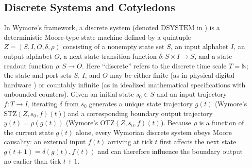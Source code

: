 \subsection{Discrete Systems and Cotyledons}
In Wymore's framework, a discrete system (denoted $\mathrm{DSYSTEM}$ in \citet{Wymore1993}) is a deterministic Moore-type state machine defined by a quintuple $Z=(S,I,O,\delta,\rho)$ consisting of a nonempty state set $S$, an input alphabet $I$, an output alphabet $O$, a next-state transition function $\delta:S\times I\to S$, and a state readout function $\rho:S\to O$. Here ``discrete'' refers to the discrete time scale $T=\mathbb{N}$; the state and port sets $S$, $I$, and $O$ may be either finite (as in physical digital hardware \citep{Wymore1993,BaierKatoen2008}) or countably infinite (as in idealized mathematical specifications with unbounded counters). Given an initial state $s_0\in S$ and an input trajectory $f:T\to I$, iterating $\delta$ from $s_0$ generates a unique state trajectory $g(t)$ (Wymore's $\mathrm{STZ}(Z,s_0,f)(t)$) and a corresponding boundary output trajectory $y(t)=\rho(g(t))$ (Wymore's $\mathrm{OTZ}(Z,s_0,f)(t)$). Because $\rho$ is a function of the current state $g(t)$ alone, every Wymorian discrete system obeys Moore causality: an external input $f(t)$ arriving at tick $t$ first affects the next state $g(t+1)=\delta(g(t),f(t))$ and can therefore influence the boundary output no earlier than tick $t+1$.

